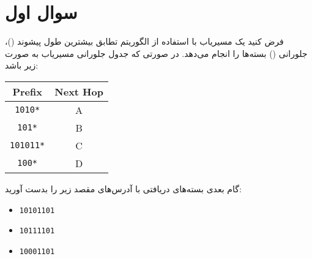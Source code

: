 \section{سوال اول}

فرض کنید یک مسیریاب با استفاده از الگوریتم تطابق بیشترین طول پیشوند ()، جلو‌رانی () بسته‌ها را انجام می‌دهد. در صورتی که جدول جلورانی مسیریاب به صورت زیر باشد:


\begin{latin}
	\begin{center}
		\begin{tabular}{|c|c|}
			\hline
			\textbf{Prefix} & \textbf{Next Hop} \\
			\hline\hline
			\texttt{1010*} & A \\
			\hline
			\texttt{101*} & B \\
			\hline
			\texttt{101011*} & C \\
			\hline
			\texttt{100*} & D \\
			\hline
		\end{tabular}
	\end{center}
\end{latin}



گام بعدی بسته‌های دریافتی با آدرس‌های مقصد زیر را بدست آورید:

\begin{itemize}
	\item \texttt{10101101}
	\begin{qsolve}
		
	\end{qsolve}
	
	\item \texttt{10111101}
	\begin{qsolve}
		
	\end{qsolve}
	
	\item \texttt{10001101}
	\begin{qsolve}
		
	\end{qsolve}
\end{itemize}


